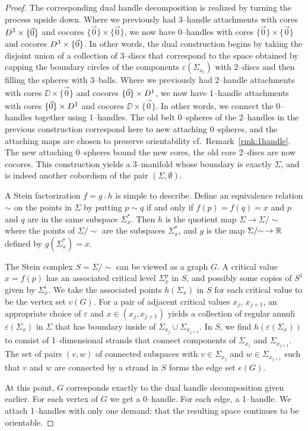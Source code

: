 \begin{proof}
	
	The corresponding dual handle decomposition is realized by turning the process upside down.
	Where we previously had 3--handle attachments with cores $D^3\times\{\vec{0}\}$ and cocores $\{\vec{0}\}\times\{\vec{0}\}$, we now have 0--handles with cores $\{\vec{0}\}\times\{\vec{0}\}$ and cocores $D^3\times\{\vec{0}\}$.
	In other words, the dual construction begins by taking the disjoint union of a collection of 3--discs that correspond to the space obtained by capping the boundary circles of the components $\varepsilon(\Sigma_{x_i})$ with 2--discs and then filling the spheres with 3--balls.
	Where we previously had 2--handle attachments with cores $\DD\times\{\vec{0}\}$ and cocores $\{\vec{0}\}\times D^1$, we now have 1--handle attachments with cores $\{\vec{0}\}\times D^1$ and cocores $\DD\times\{\vec{0}\}$.
	In other words, we connect the 0--handles together using 1--handles.
	The old belt 0--spheres of the 2--handles in the previous construction correspond here to new attaching 0--spheres, and the attaching maps are chosen to preserve orientability cf.\ Remark~\ref{rmk:1handle}.
	The new attaching 0--spheres bound the new cores, the old core 2--discs are now cocores.
	This construction yields a 3--manifold whose boundary is exactly $\Sigma$, and is indeed another cobordism of the pair $(\Sigma,\emptyset)$.
	
	A Stein factorization $f=g\comp h$ is simple to describe.
	Define an equivalence relation $\sim$ on the points in $\Sigma$ by putting $p\sim q$ if and only if $f(p)=f(q)=x$ and $p$ and $q$ are in the same subspace $\Sigma_x^*$.
	Then $h$ is the quotient map $\Sigma\to \Sigma/\!\!\sim$ where the points of $\Sigma/\!\!\sim$ are the subspaces $\Sigma_x^*$, and $g$ is the map $\Sigma/\!\!\sim\, \to\mathbb{R}$ defined by $g(\Sigma_x^*)=x$.

	The Stein complex $S=\Sigma/\!\!\sim$ can be viewed as a graph $G$.
	A critical value $x=f(p)$ has an associated critical level $\Sigma_x^p$ in $S$, and possibly some copies of $S^1$ given by $\Sigma_x^i$.
	We take the associated points $h(\Sigma_x)$ in $S$ for each critical value to be the vertex set $v(G)$.
	For a pair of adjacent critical values $x_{j}$, $x_{j+1}$, an appropriate choice of $\varepsilon$ and $x\in(x_{j},x_{j+1})$ yields a collection of regular annuli $\varepsilon(\Sigma_x)$ in $\Sigma$ that has boundary inside of $\Sigma_{x_{j}}\cup\Sigma_{x_{j+1}}$.
	In $S$, we find $h(\varepsilon(\Sigma_x))$ to consist of 1--dimensional strands that connect components of $\Sigma_{x_{j}}$ and $\Sigma_{x_{j+1}}$.
	The set of pairs $(v,w)$ of connected subspaces with $v\in\Sigma_{x_{j}}$ and $w\in\Sigma_{x_{j+1}}$ such that $v$ and $w$ are connected by a strand in $S$ forms the edge set $e(G)$.
	
	At this point, $G$ corresponds exactly to the dual handle decomposition given earlier.
	For each vertex of $G$ we get a 0--handle.
	For each edge, a 1--handle.
	We attach 1--handles with only one demand: that the resulting space continues to be orientable.
\end{proof}

